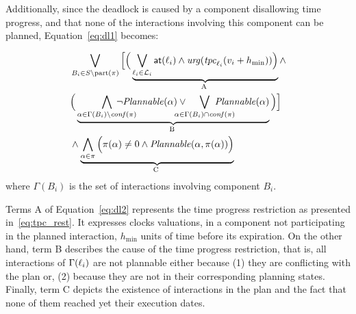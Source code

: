   Additionally, since the deadlock is caused by a component disallowing 
  time progress, and that none of the interactions involving this component
  can be planned, Equation~\ref{eq:dl1} becomes:
  
  \begin{equation}\label{eq:dl2}
  \begin{split}
    &\bigvee_{B_i\in S\setminus\p{\pi}}\Big[\Big(
    \underbrace{\bigvee_{\loc_i\in\Loc_i}\at{\loc_i}
  \wedge\urg(\tpc{\loc_i}(\val_i+h_{\min}))\Big)}_\text{\mytag{A}{A}}\wedge\\
  &\Big(\underbrace{\bigwedge_{\alpha\in\Gamma(B_i)\setminus\confl(\pi)}\hspace{-8mm}
    \neg\plntxt{\alpha}\vee\hspace{-5mm}\bigvee_{\alpha\in\Gamma(B_i)\cap\confl(\pi)}
\hspace{-8mm}\plntxt{\alpha}}_\text{\mytag{B}{B}}\Big)\Big]\\
&\wedge\underbrace{\bigwedge_{\alpha\in\pi}\Big(\pi(\alpha)\neq0\wedge
    \plnIntxt{\alpha}{\pi(\alpha)}\Big)}_\text{\mytag{C}{C}} 
  \end{split}
  \end{equation}
  where $\Gamma(B_i)$ is the set of interactions involving component $B_i$.

Terms A of Equation~\ref{eq:dl2} represents the time progress restriction as presented
in~\ref{eq:tpc_rest}. It expresses clocks valuations, in a component not participating 
in the planned interaction, $h_{\min}$ units of time before its expiration. On the other hand,
term B describes the cause of the time progress restriction, that is, all interactions
of $\Gamma(\ell_i)$ are not plannable either because (1) they are conflicting with the plan
or, (2) because they are not in their corresponding planning states.
Finally, term C depicts the existence of interactions in the plan and the fact that none of them
reached yet their execution dates.
 
